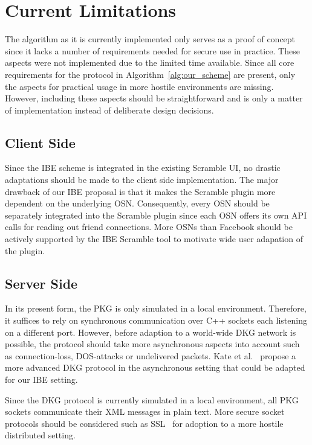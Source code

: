 \section{Current Limitations}
\label{sec:limitations_of_implementation}
The algorithm as it is currently implemented only serves as a proof of concept since it lacks a number of requirements needed for secure use in practice. These aspects were not implemented due to the limited time available. Since all core requirements for the protocol in Algorithm~\ref{alg:our_scheme} are present, only the aspects for practical usage in more hostile environments are missing. However, including these aspects should be straightforward and is only a matter of implementation instead of deliberate design decisions.

\subsection{Client Side}
Since the IBE scheme is integrated in the existing Scramble UI, no drastic adaptations should be made to the client side implementation. The major drawback of our IBE proposal is that it makes the Scramble plugin more dependent on the underlying OSN. Consequently, every OSN should be separately integrated into the Scramble plugin since each OSN offers its own API calls for reading out friend connections. More OSNs than Facebook should be actively supported by the IBE Scramble tool to motivate wide user adapation of the plugin.

\subsection{Server Side}
In its present form, the PKG is only simulated in a local environment. Therefore, it suffices to rely on synchronous communication over C++ sockets each listening on a different port. However, before adaption to a world-wide DKG network is possible, the protocol should take more asynchronous aspects into account such as connection-loss, DOS-attacks or undelivered packets. Kate et al.~\cite{art:KateHG12} propose a more advanced DKG protocol in the asynchronous setting that could be adapted for our IBE setting.

Since the DKG protocol is currently simulated in a local environment, all PKG sockets communicate their XML messages in plain text. More secure socket protocols should be considered such as SSL~\cite{rfc6101} for adoption to a more hostile distributed setting.

